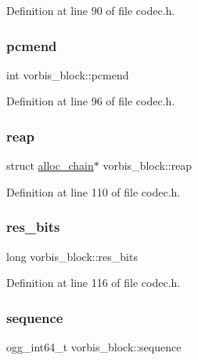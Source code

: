 Definition at line 90 of file codec.\+h.

\mbox{\label{structvorbis__block_a946562a7fdb80cabf6ee749bdce1a0ed}} 
\subsubsection{\texorpdfstring{pcmend}{pcmend}}
{\footnotesize\ttfamily int vorbis\+\_\+block\+::pcmend}



Definition at line 96 of file codec.\+h.

\mbox{\label{structvorbis__block_a047afc2ab3e3936d86817ff45c0eecde}} 
\subsubsection{\texorpdfstring{reap}{reap}}
{\footnotesize\ttfamily struct \mbox{\hyperlink{structalloc__chain}{alloc\+\_\+chain}}$\ast$ vorbis\+\_\+block\+::reap}



Definition at line 110 of file codec.\+h.

\mbox{\label{structvorbis__block_a3c91d73c477db77f4b85ded0fdcb607c}} 
\subsubsection{\texorpdfstring{res\_bits}{res\_bits}}
{\footnotesize\ttfamily long vorbis\+\_\+block\+::res\+\_\+bits}



Definition at line 116 of file codec.\+h.

\mbox{\label{structvorbis__block_a09e48c70ae79cae2d37a4e0e55f294ef}} 
\subsubsection{\texorpdfstring{sequence}{sequence}}
{\footnotesize\ttfamily ogg\+\_\+int64\+\_\+t vorbis\+\_\+block\+::sequence}



